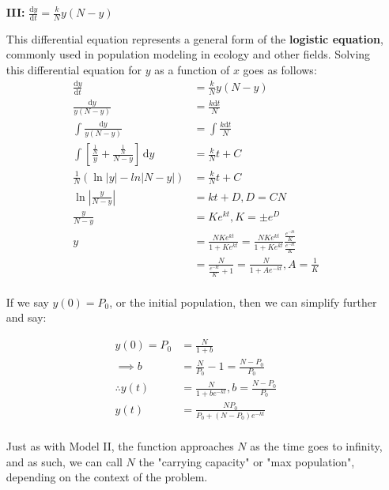 \documentclass[12pt]{article}
\begin{document}
\begin{itemize}
    \item[\textbf{III:}] $\frac{\text{d}y}{\text{d}t} = \frac{k}{N}y(N-y)$
    
    This differential equation represents a general form of the \textbf{logistic equation}, commonly used in population modeling in ecology and other fields. Solving this differential equation for $y$ as a function of $x$ goes as follows:
    \begin{equation}
        \begin{split}
            \frac{\text{d}y}{\text{d}t} &= \frac{k}{N}y(N-y)\\
            \frac{\text{d}y}{y(N-y)} &= \frac{k \text{d}t}{N}\\
            \int \frac{\text{d}y}{y(N-y)} &= \int \frac{k \text{d}t}{N}\\
            \int [\frac{\frac{1}{N}}{y} + \frac{\frac{1}{N}}{N-y}] \,\text{d}y &= \frac{k}{N} t + C\\
            \frac{1}{N}(\ln|y| - ln|N-y|) &= \frac{k}{N} t + C\\
            \ln|\frac{y}{N-y}| &= kt + D, D = CN\\
            \frac{y}{N-y} &= Ke^{kt}, K = \pm e^D\\
            y &= \frac{NKe^{kt}}{1+Ke^{kt}} =\frac{NKe^{kt}}{1+Ke^{kt}} \frac{\frac{e^{-kt}}{K}}{\frac{e^{-kt}}{K}}\\
            &= \frac{N}{\frac{e^{-kt}}{K} + 1} = \frac{N}{1+Ae^{-kt}}, A = \frac{1}{K}\\
        \end{split}
    \end{equation}

    If we say $y(0) = P_0$, or the initial population, then we can simplify further and say:

    \begin{equation}
        \begin{split}
            y(0) = P_0 &= \frac{N}{1+b}\\
            \implies b &= \frac{N}{P_0} - 1 = \frac{N-P_0}{P_0}\\
            \therefore y(t) &= \frac{N}{1+be^{-kt}}, b = \frac{N-P_0}{P_0}\\
            y(t) &= \frac{NP_0}{P_0 + (N-P_0)e^{-kt}}\\
        \end{split}
    \end{equation}

    Just as with Model II, the function approaches $N$ as the time goes to infinity, and as such, we can call $N$ the "carrying capacity" or "max population", depending on the context of the problem.


\end{itemize}
\end{document}
